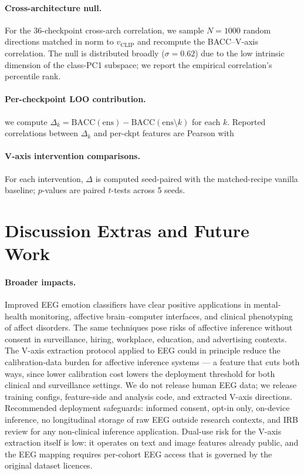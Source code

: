 \paragraph{Cross-architecture null.} For the 36-checkpoint cross-arch
correlation, we sample $N=1000$ random directions matched in norm to
$v_{\mathrm{CLIP}}$ and recompute the BACC--V-axis correlation. The
null is distributed broadly ($\sigma=0.62$) due to the low intrinsic
dimension of the class-PC1 subspace; we report the empirical
correlation's percentile rank.

\paragraph{Per-checkpoint LOO contribution.}  we compute $\Delta_k = \mathrm{BACC}(\mathrm{ens}) -
\mathrm{BACC}(\mathrm{ens}\setminus k)$ for each $k$. Reported
correlations between $\Delta_k$ and per-ckpt features are Pearson with

\paragraph{V-axis intervention comparisons.} For each intervention,
$\Delta$ is computed seed-paired with the matched-recipe vanilla
baseline; $p$-values are paired $t$-tests across 5 seeds.


\section{Discussion Extras and Future Work}
\label{app:discussion-extras}

\paragraph{Broader impacts.} Improved EEG emotion classifiers have
clear positive applications in mental-health monitoring, affective
brain--computer interfaces, and clinical phenotyping of affect
disorders. The same techniques pose risks of affective inference
without consent in surveillance, hiring, workplace, education, and
advertising contexts. The V-axis extraction protocol applied to EEG
could in principle reduce the calibration-data burden for affective
inference systems --- a feature that cuts both ways, since lower
calibration cost lowers the deployment threshold for both clinical
and surveillance settings. We do not release human EEG data; we
release training configs, feature-side and analysis code, and
extracted V-axis directions. Recommended deployment safeguards:
informed consent, opt-in only, on-device inference, no longitudinal
storage of raw EEG outside research contexts, and IRB review for any
non-clinical inference application. Dual-use risk for the V-axis
extraction itself is low: it operates on text and image features
already public, and the EEG mapping requires per-cohort EEG access
that is governed by the original dataset licences.

